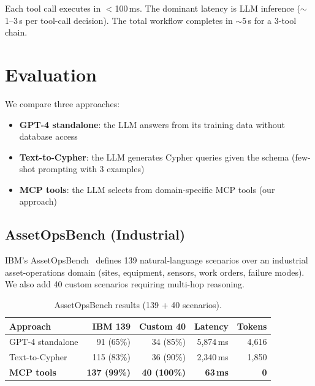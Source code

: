\documentclass[sigconf, anonymous, review]{acmart}
\begin{document}
Each tool call executes in $<$100\,ms.  The dominant latency is
LLM inference (${\sim}$1--3\,s per tool-call decision).  The total
workflow completes in ${\sim}$5\,s for a 3-tool chain.

\section{Evaluation}\label{sec:evaluation}

We compare three approaches:

\begin{itemize}
\item \textbf{GPT-4 standalone}: the LLM answers from its training
  data without database access
\item \textbf{Text-to-Cypher}: the LLM generates Cypher queries
  given the schema (few-shot prompting with 3 examples)
\item \textbf{MCP tools}: the LLM selects from domain-specific
  MCP tools (our approach)
\end{itemize}

\subsection{AssetOpsBench (Industrial)}

IBM's AssetOpsBench~\cite{baek2024assetopsbench} defines 139
natural-language scenarios over an industrial asset-operations
domain (sites, equipment, sensors, work orders, failure modes).
We also add 40 custom scenarios requiring multi-hop reasoning.

\begin{table}[t]
\centering
\caption{AssetOpsBench results (139 + 40 scenarios).}
\label{tab:assetops}
\small
\begin{tabular}{@{}lrrrr@{}}
\toprule
\textbf{Approach} & \textbf{IBM 139} & \textbf{Custom 40}
  & \textbf{Latency} & \textbf{Tokens} \\
\midrule
GPT-4 standalone  & 91 (65\%) & 34 (85\%) & 5,874\,ms & 4,616 \\
Text-to-Cypher    & 115 (83\%) & 36 (90\%) & 2,340\,ms & 1,850 \\
\textbf{MCP tools}& \textbf{137 (99\%)} & \textbf{40 (100\%)}
  & \textbf{63\,ms} & \textbf{0} \\
\bottomrule
\end{tabular}
\end{table}
\end{document}

